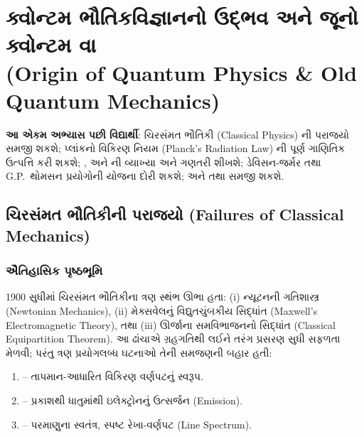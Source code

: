 \chapter[એકમ 1 : ક્વોન્ટમ ભૌતિકવિજ્ઞાનનો ઉદ્ભવ અને જૂનો ક્વોન્ટમ વાદ]{ક્વોન્ટમ ભૌતિકવિજ્ઞાનનો ઉદ્ભવ અને જૂનો ક્વોન્ટમ વા\\
{\large (Origin of Quantum Physics \& Old Quantum Mechanics)}}
\label{ch:unit1}

\begin{mulmudda}
\textbf{આ એકમ અભ્યાસ પછી વિદ્યાર્થી}: ચિરસંમત ભૌતિકી (Classical Physics) ની પરાજયો સમજી શકશે;
પ્લાંકનો વિકિરણ નિયમ (Planck's Radiation Law) ની પૂર્ણ ગાણિતિક ઉત્પત્તિ કરી શકશે; ,  અને  ની
વ્યાખ્યા અને ગણતરી શીખશે; ડેવિસન-જર્મર તથા G.P.\ થોમસન પ્રયોગોની યોજના દોરી શકશે; અને
 તથા
 સમજી શકશે.
\end{mulmudda}

\section{ચિરસંમત ભૌતિકીની પરાજયો (Failures of Classical Mechanics)}

\subsection{ઐતિહાસિક પૃષ્ઠભૂમિ}

1900 સુધીમાં ચિરસંમત ભૌતિકીના ત્રણ સ્થંભ ઊભા હતા:
(i) ન્યૂટનની ગતિશાસ્ત્ર (Newtonian Mechanics),
(ii) મેક્સવેલનું વિદ્યુતચુંબકીય સિદ્ધાંત (Maxwell's Electromagnetic Theory), તથા
(iii) ઊર્જાના સમવિભાજનનો સિદ્ધાંત (Classical Equipartition Theorem).
આ ઢાંચાએ ગ્રહગતિથી લઈને તરંગ પ્રસરણ સુધી સફળતા મેળવી; પરંતુ ત્રણ પ્રયોગલબ્ધ ઘટનાઓ તેની સમજણની
બહાર હતી:

\begin{enumerate}
  \item \textbf{} -- તાપમાન-આધારિત વિકિરણ વર્ણપટનું સ્વરૂપ.
  \item \textbf{} -- પ્રકાશથી ધાતુમાંથી ઇલેક્ટ્રોનનું ઉત્સર્જન (Emission).
  \item \textbf{} -- પરમાણુના સ્વતંત્ર, સ્પષ્ટ રેખા-વર્ણપટ (Line Spectrum).
\end{enumerate}

